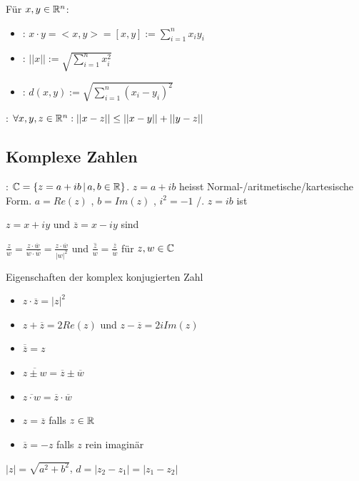 \Def Für $x, y \in \mathbb{R}^n$:
\vspace{-0.6em}
\begin{itemize}
    \item {}: $x \cdot y = <x,y> = [x,y] := \sum_{i=1}^{n}x_i y_i$
    \item {}: $||x|| := \sqrt{\sum_{i=1}^{n}x_i^2}$
    \item {}: $d(x,y) := \sqrt{\sum_{i=1}^{n}(x_i-y_i)^2}$
\end{itemize}

\Satz {}: $\forall x,y,z \in \mathbb{R}^n : ||x-z||\le ||x-y|| + ||y - z||$

\subsection{Komplexe Zahlen}

\Def {}: $\mathbb{C} = \{z = a + ib \, | \, a,b \in \mathbb{R}\}$.
$z = a + ib$ heisst Normal-/aritmetische/kartesische Form. $a = Re(z)$ ,
$b = Im(z)$ , $i^2 = -1$ /. $z = ib$ ist 

\Def $z = x + iy$ und $\overline{z} = x - iy$ sind 

\Satz $\frac{z}{w} = \frac{z \cdot \overline{w}}{w \cdot \overline{w}} = \frac{z \cdot \overline{w}}{|w|^2}$
und $\overline{\frac{z}{w}} = \frac{\overline{z}}{\overline{w}}$ für $z,w \in \mathbb{C}$

\Satz Eigenschaften der komplex konjugierten Zahl
\vspace{-0.6em}
\begin{itemize}
    \item $z \cdot \overline{z} = |z|^2$
    \item $z + \overline{z} = 2 Re(z)$ und $z - \overline{z} = 2iIm(z)$
    \item $\overline{\overline{z}} = z$
    \item $\overline{z \pm w} = \overline{z} \pm \overline{w}$
    \item $\overline{z \cdot w} = \overline{z} \cdot \overline{w}$
    \item $z = \overline{z}$ falls $z \in \mathbb{R}$
    \item $\overline{z} = -z$ falls $z$ rein imaginär
\end{itemize}

\Def {} $|z| = \sqrt{a^2 + b^2}$,
 $d = |z_2 - z_1| = |z_1 - z_2|$

